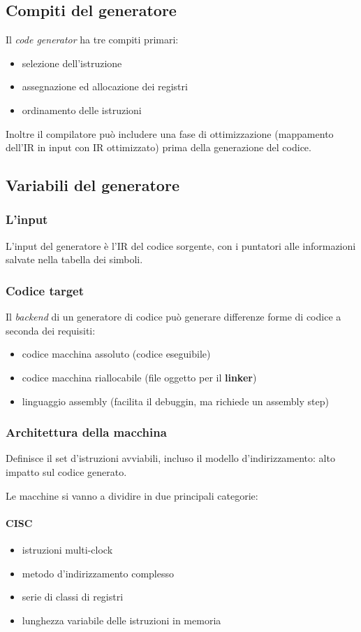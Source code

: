 \subsection{Compiti del generatore}
Il \textit{code generator} ha tre compiti primari:
\begin{itemize}
\item selezione dell'istruzione
\item assegnazione ed allocazione dei registri
\item ordinamento delle istruzioni
\end{itemize}

Inoltre il compilatore pu\`o includere una fase di ottimizzazione (mappamento
dell'IR in input con IR ottimizzato) prima della generazione del codice.

\subsection{Variabili del generatore}
\subsubsection{L'input}
L'input del generatore \`e l'IR del codice sorgente, con i puntatori alle
informazioni salvate nella tabella dei simboli.
\subsubsection{Codice target}
Il \textit{backend} di un generatore di codice pu\`o generare differenze forme
di codice a seconda dei requisiti:
\begin{itemize}
\item codice macchina assoluto (codice eseguibile)
\item codice macchina riallocabile (file oggetto per il \textbf{linker})
\item linguaggio assembly (facilita il debuggin, ma richiede un assembly step)
\end{itemize}

\subsubsection{Architettura della macchina}
Definisce il set d'istruzioni avviabili, incluso il modello d'indirizzamento:
alto impatto sul codice generato.

Le macchine si vanno a dividire in due principali categorie:
\paragraph{CISC}
\begin{itemize}
\item istruzioni multi-clock
\item metodo d'indirizzamento complesso
\item serie di classi di registri
\item lunghezza variabile delle istruzioni in memoria
\end{itemize}
